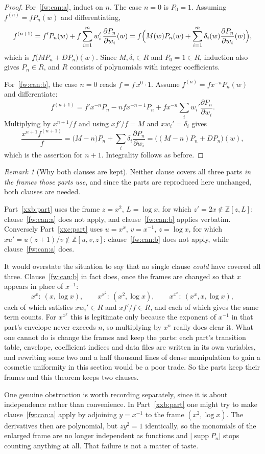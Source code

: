 \documentclass[11pt,a4paper]{article}
\numberwithin{equation}{section}
\theoremstyle{definition}
\theoremstyle{remark}
\newtheorem{remark}[theorem]{Remark}
\theoremstyle{plain}
\DeclareMathOperator{\supp}{supp}
\newcommand{\Z}{\mathbb Z}
\begin{document}
\begin{proof}
For~\ref{fw:can:a}, induct on $n$.  The case $n=0$ is $P_0=1$.  Assuming
$f^{(n)}=fP_n(w)$ and differentiating,
\[
 f^{(n+1)}
 =f'P_n(w)+f\sum_{i=1}^m w_i'\,\frac{\partial P_n}{\partial w_i}(w)
 =f\Bigl(M(w)P_n(w)+\sum_{i=1}^m\delta_i(w)\frac{\partial P_n}{\partial w_i}(w)\Bigr),
\]
which is $f\bigl(MP_n+DP_n\bigr)(w)$.  Since $M,\delta_i\in R$ and $P_0=1\in R$,
induction also gives $P_n\in R$, and $R$ consists of polynomials with integer
coefficients.

For~\ref{fw:can:b}, the case $n=0$ reads $f=f\,x^{0}\cdot1$.  Assume
$f^{(n)}=fx^{-n}P_n(w)$ and differentiate:
\[
 f^{(n+1)}
 =f'x^{-n}P_n-nfx^{-n-1}P_n+fx^{-n}\sum_i w_i'\frac{\partial P_n}{\partial w_i}.
\]
Multiplying by $x^{n+1}/f$ and using $xf'/f=M$ and $xw_i'=\delta_i$ gives
\[
 \frac{x^{n+1}f^{(n+1)}}{f}=\bigl(M-n\bigr)P_n+\sum_i\delta_i\frac{\partial P_n}{\partial w_i}
 =\bigl((M-n)P_n+DP_n\bigr)(w),
\]
which is the assertion for $n+1$.  Integrality follows as before.
\end{proof}

\begin{remark}[Why both clauses are kept]\label{fw:rem:twoforms}
Neither clause covers all three parts \emph{in the frames those parts use}, and
since the parts are reproduced here unchanged, both clauses are needed.

Part~\ref{xxb:part} uses the frame $z=x^2$, $L=\log x$, for which
$z'=2x\notin\Z[z,L]$: clause~\ref{fw:can:a} does not apply, and
clause~\ref{fw:can:b} applies verbatim.  Conversely Part~\ref{xxc:part} uses
$u=x^x$, $v=x^{-1}$, $z=\log x$, for which $xu'=u(z+1)/v\notin\Z[u,v,z]$:
clause~\ref{fw:can:b} does not apply, while clause~\ref{fw:can:a} does.

It would overstate the situation to say that no single clause \emph{could} have
covered all three.  Clause~\ref{fw:can:b} in fact does, once the frames are
changed so that $x$ appears in place of $x^{-1}$:
\[
 x^x:\ (x,\log x),\qquad x^{x^2}:\ (x^2,\log x),\qquad x^{x^x}:\ (x^x,x,\log x),
\]
each of which satisfies $xw_i'\in R$ and $xf'/f\in R$, and each of which gives
the same term counts.  For $x^{x^x}$ this is legitimate only because the
exponent of $x^{-1}$ in that part's envelope never exceeds $n$, so multiplying
by $x^{n}$ really does clear it.  What one cannot do is change the frames and
keep the parts: each part's transition table, envelope, coefficient indices and
data files are written in its own variables, and rewriting some two and a half
thousand lines of dense manipulation to gain a cosmetic uniformity in this
section would be a poor trade.  So the parts keep their frames and this theorem
keeps two clauses.

One genuine obstruction is worth recording separately, since it is about
independence rather than convenience.  In Part~\ref{xxb:part} one might try to
make clause~\ref{fw:can:a} apply by adjoining $y=x^{-1}$ to the frame
$(x^2,\log x)$.  The derivatives then are polynomial, but $zy^2=1$ identically,
so the monomials of the enlarged frame are no longer independent as functions
and $|\supp P_n|$ stops counting anything at all.  That failure is not a matter
of taste.
\end{remark}
\end{document}
